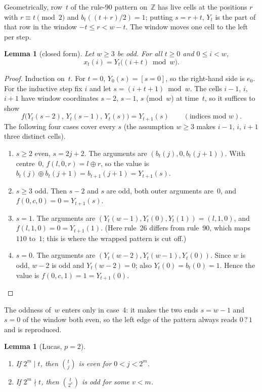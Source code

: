 \documentclass[11pt]{article}
\newtheorem{lemma}[theorem]{Lemma}
\theoremstyle{definition}
\theoremstyle{remark}
\newcommand{\Z}{\mathbb{Z}}
\begin{document}
Geometrically, row~$t$ of the rule-90 pattern on~$\Z$ has live cells at the
positions $r$ with $r \equiv t \pmod 2$ and $b_t((t+r)/2) = 1$; putting
$s = r + t$, $Y_t$ is the part of that row in the window $-t \le r < w - t$.
The window moves one cell to the left per step.

\begin{lemma}[closed form]\label{lem:closed}
Let $w \ge 3$ be odd. For all $t \ge 0$ and $0 \le i < w$,
\[
x_t(i) = Y_t\big((i+t) \bmod w\big).
\]
\end{lemma}

\begin{proof}
Induction on~$t$. For $t = 0$, $Y_0(s) = [s = 0]$, so the right-hand side is
$e_0$. For the inductive step fix $i$ and let $s = (i+t+1) \bmod w$. The cells
$i-1$, $i$, $i+1$ have window coordinates $s-2$, $s-1$, $s$ (mod~$w$) at
time~$t$, so it suffices to show
\[
f\big(Y_t(s-2),\,Y_t(s-1),\,Y_t(s)\big) = Y_{t+1}(s) \qquad (\text{indices mod } w).
\]
The following four cases cover every $s$ (the assumption $w \ge 3$ makes
$i-1$, $i$, $i+1$ three distinct cells).
\begin{enumerate}
\item $s \ge 2$ even, $s = 2j+2$. The arguments are $(b_t(j), 0, b_t(j+1))$.
  With centre~$0$, $f(l,0,r) = l \oplus r$, so the value is
  $b_t(j) \oplus b_t(j+1) = b_{t+1}(j+1) = Y_{t+1}(s)$.
\item $s \ge 3$ odd. Then $s-2$ and $s$ are odd, both outer arguments are~$0$,
  and $f(0,c,0) = 0 = Y_{t+1}(s)$.
\item $s = 1$. The arguments are $(Y_t(w-1), Y_t(0), Y_t(1)) = (l, 1, 0)$, and
  $f(l,1,0) = 0 = Y_{t+1}(1)$. (Here rule~26 differs from rule~90, which maps
  $110$ to~$1$; this is where the wrapped pattern is cut off.)
\item $s = 0$. The arguments are $(Y_t(w-2), Y_t(w-1), Y_t(0))$. Since $w$ is
  odd, $w-2$ is odd and $Y_t(w-2) = 0$; also $Y_t(0) = b_t(0) = 1$. Hence the
  value is $f(0,c,1) = 1 = Y_{t+1}(0)$. \qedhere
\end{enumerate}
\end{proof}

The oddness of~$w$ enters only in case~4: it makes the two ends $s = w-1$ and
$s = 0$ of the window both even, so the left edge of the pattern always reads
$0\,?\,1$ and is reproduced.

\begin{lemma}[Lucas, $p = 2$]\label{lem:lucas}
\begin{enumerate}
\item[(a)] If $2^{m} \mid t$, then $\binom{t}{j}$ is even for $0 < j < 2^{m}$.
\item[(b)] If $2^{m} \nmid t$, then $\binom{t}{2^{v}}$ is odd for some $v < m$.
\end{enumerate}
\end{lemma}
\end{document}
